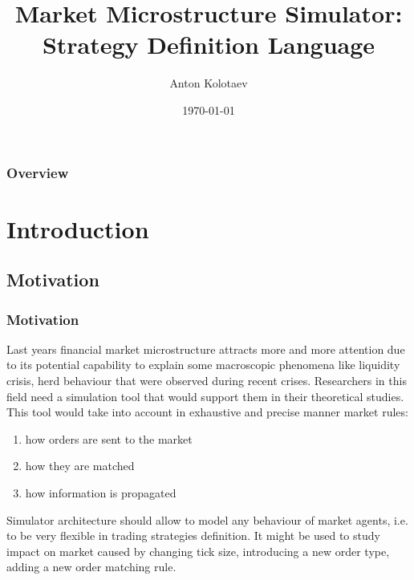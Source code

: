 \documentclass{beamer}
\title[FiQuant Market Simulator]{Market Microstructure Simulator: Strategy Definition Language} %
\author{Anton Kolotaev} %
\institute[ECP] %
{
Chair of Quantitative Finance, \'{E}cole Centrale Paris \\ %
\medskip
\textit{anton.kolotaev@gmail.com} %
}
\date{\today} %
\begin{document}
\begin{frame}
\titlepage %
\end{frame}

\begin{frame}
\frametitle{Overview} %
\tableofcontents %
\end{frame}


\section{Introduction}
\subsection{Motivation}
\begin{frame}
\frametitle{Motivation}
Last years financial market microstructure attracts more and more attention due to its potential capability to explain some macroscopic phenomena like liquidity crisis, herd behaviour that were observed during recent crises. Researchers in this field need a simulation tool that would support them in their theoretical studies. This tool would take into account in exhaustive and precise manner market rules:
\begin{enumerate}
\item how orders are sent to the market
\item how they are matched
\item how information is propagated 
\end{enumerate}
Simulator architecture should allow to model any behaviour of market agents, i.e. to be very flexible in trading strategies definition. It might be used to study impact on market caused by changing tick size, introducing a new order type, adding a new order matching rule.
\end{frame}
\end{document}
